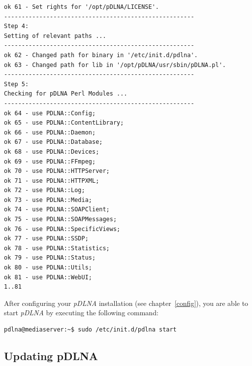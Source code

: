 \documentclass[a4paper,oneside,10pt]{report}
\begin{document}
\begin{lstlisting}
ok 61 - Set rights for '/opt/pDLNA/LICENSE'.
------------------------------------------------------
Step 4:
Setting of relevant paths ...
------------------------------------------------------
ok 62 - Changed path for binary in '/etc/init.d/pdlna'.
ok 63 - Changed path for lib in '/opt/pDLNA/usr/sbin/pDLNA.pl'.
------------------------------------------------------
Step 5:
Checking for pDLNA Perl Modules ...
------------------------------------------------------
ok 64 - use PDLNA::Config;
ok 65 - use PDLNA::ContentLibrary;
ok 66 - use PDLNA::Daemon;
ok 67 - use PDLNA::Database;
ok 68 - use PDLNA::Devices;
ok 69 - use PDLNA::FFmpeg;
ok 70 - use PDLNA::HTTPServer;
ok 71 - use PDLNA::HTTPXML;
ok 72 - use PDLNA::Log;
ok 73 - use PDLNA::Media;
ok 74 - use PDLNA::SOAPClient;
ok 75 - use PDLNA::SOAPMessages;
ok 76 - use PDLNA::SpecificViews;
ok 77 - use PDLNA::SSDP;
ok 78 - use PDLNA::Statistics;
ok 79 - use PDLNA::Status;
ok 80 - use PDLNA::Utils;
ok 81 - use PDLNA::WebUI;
1..81
\end{lstlisting}

After configuring your {\em pDLNA} installation (see chapter~\ref{config}), you are able to start {\em pDLNA} by executing the following command:
\begin{lstlisting}
pdlna@mediaserver:~$ sudo /etc/init.d/pdlna start
\end{lstlisting}

\subsection{Updating pDLNA}
\label{install-unix-latest-release-updating}
\end{document}
